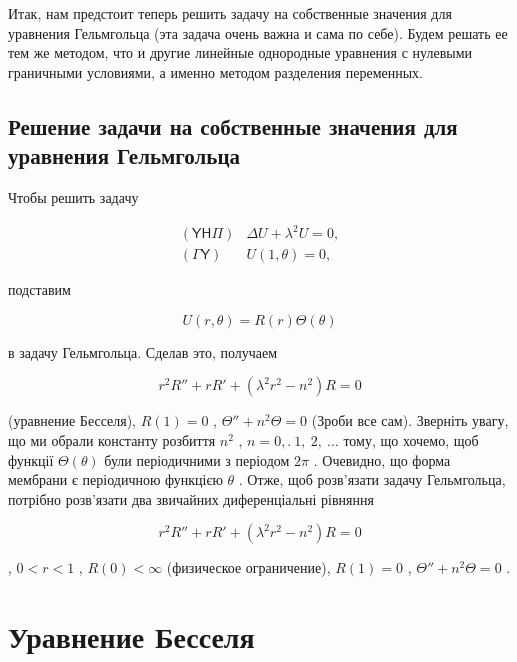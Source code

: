 \documentclass[
  ukrainian,
]{article}
\begin{document}
Итак, нам предстоит теперь решить задачу на собственные значения для
уравнения Гельмгольца (эта задача очень важна и сама по себе). Будем
решать ее тем же методом, что и другие линейные однородные уравнения с
нулевыми граничными условиями, а именно методом разделения переменных.

\subsection{Решение задачи на собственные значения для уравнения
Гельмгольца}\label{ux440ux435ux448ux435ux43dux438ux435-ux437ux430ux434ux430ux447ux438-ux43dux430-ux441ux43eux431ux441ux442ux432ux435ux43dux43dux44bux435-ux437ux43dux430ux447ux435ux43dux438ux44f-ux434ux43bux44f-ux443ux440ux430ux432ux43dux435ux43dux438ux44f-ux433ux435ux43bux44cux43cux433ux43eux43bux44cux446ux430}

Чтобы решить задачу

\[
\begin{aligned} (\mathsf{Y}\mathsf{H}\mathsf{\Pi}) & \Delta U + \lambda^2 U = 0, \\ (\mathsf{\Gamma}\mathsf{Y}) & U(1, \theta) = 0, \end{aligned}
\]

подставим

\[
U(r, \theta) = R(r) \Theta(\theta)
\]

в задачу Гельмгольца. Сделав это, получаем

\[
r^2R'' + rR' + (\lambda^2r^2 - n^2)R = 0
\]

(уравнение Бесселя), \(R(1) = 0\) , \(\Theta'' + n^2\Theta = 0\) (Зроби
все сам). Зверніть увагу, що ми обрали константу розбиття \(n^2\) ,
\(n=0,. \ 1,\ 2,\ \ldots\) тому, що хочемо, щоб функції
\(\Theta\left(\theta\right)\) були періодичними з періодом \(2\pi\) .
Очевидно, що форма мембрани є періодичною функцією \(\theta\) . Отже,
щоб розв'язати задачу Гельмгольца, потрібно розв'язати два звичайних
диференціальні рівняння

\[
r^2R'' + rR' + (\lambda^2r^2 - n^2) R = 0
\]

, \(0 < r < 1\) , \(R(0) < \infty\) (физическое ограничение),
\(R(1) = 0\) , \(\Theta'' + n^2\Theta = 0\) .

\section{Уравнение
Бесселя}\label{ux443ux440ux430ux432ux43dux435ux43dux438ux435-ux431ux435ux441ux441ux435ux43bux44f}
\end{document}
